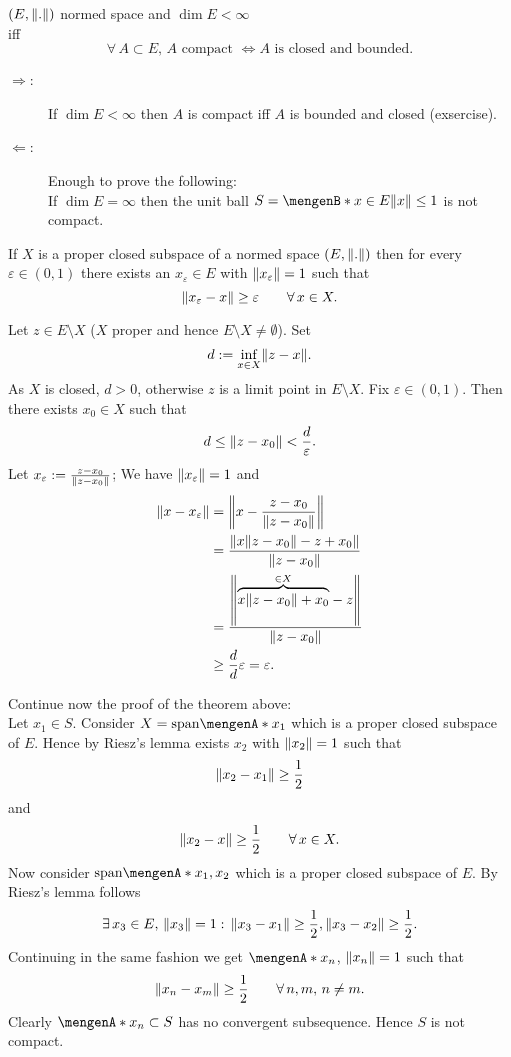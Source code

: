 \begin{theorem}
	$(E,\norm{.})$ normed space and $\dim E < \infty$ \\ iff \[
		\forall\, A \subset E,\,A \text{ compact } \Leftrightarrow A \text{ is closed and bounded}.
	\]
\end{theorem}
\begin{beweis}
	\begin{description}
		\item[$\Rightarrow$:]If $\dim E < \infty$ then $A$ is compact iff $A$ is bounded and closed (exsercise).
		\item[$\Leftarrow$:]Enough to prove the following: \\
		If $\dim E = \infty$ then the unit ball $S = \set[x \in E]{\norm{x}\leq 1}$ is not compact.
	\end{description}
\begin{lemma}
	If $X$ is a proper closed subspace of a normed space $(E,\norm{.})$ then for every $\varepsilon \in (0,1)$ there exists an $x_{\varepsilon} \in E$ with $\norm{x_\varepsilon}=1$ such that
	\[
		\norm{x_{\varepsilon}-x} \geq \varepsilon \qquad \forall\, x \in X.
	\]
\end{lemma}
\begin{beweis}
	Let $z \in E \setminus X$ ($X$ proper and hence $E \setminus X \neq \emptyset$). Set 
	\[
		d:= \inf_{x \in X}\norm{z-x}.
	\] As $X$ is closed, $d >0$, otherwise $z$ is a limit point in $E \setminus X$. Fix $\varepsilon \in (0,1)$. Then there exists $x_0 \in X$ such that
	\[
		d \leq \norm{z-x_0} < \frac{d}{\varepsilon}.
	\]
	Let $x_\varepsilon := \frac{z-x_0}{\norm{z-x_0}}$; We have $\norm{x_\varepsilon}=1$ and
	\begin{align*}
		\norm{x- x_\varepsilon} &= \norm{x - \frac{z-x_0}{\norm{z-x_0}}} \\
		&= \frac{\norm{x \norm{z-x_0}-z + x_0}}{\norm{z-x_0}} \\
		&= \frac{\norm{\overset{\in X}{\overbrace{x \norm{z-x_0}+ x_0 }}- z}}{\norm{z-x_0}} \\
		&\geq \frac{d}{d}\varepsilon = \varepsilon.
	\end{align*}
\end{beweis}
Continue now the proof of the theorem above: \\
Let $x_1 \in S$. Consider $X = \text{span} \set{x_1}$ which is a proper closed subspace of $E$. Hence by Riesz's lemma exists $x_2$ with $\norm{x_2}=1$ such that
\[
	\norm{x_2-x_1} \geq \frac{1}{2} 
\]
and
\[
	\norm{x_2-x} \geq \frac{1}{2} \qquad \forall\, x \in X.
\]
Now consider $\text{span} \set{x_1,x_2}$ which is a proper closed subspace of $E$. By Riesz's lemma follows
\[
	\exists\,x_3 \in E,\, \norm{x_3}=1: \, \norm{x_3-x_1}\geq \frac{1}{2}, \norm{x_3-x_2} \geq \frac{1}{2}.
\]
Continuing in the same fashion we get $\set{x_n}$, $\norm{x_n}=1$ such that 
\[
	\norm{x_n-x_m} \geq \frac{1}{2} \qquad \forall\, n,m,\,n \neq m.
\]
Clearly $\set{x_n} \subset S$ has no convergent subsequence. Hence $S$ is not compact.
\end{beweis}
